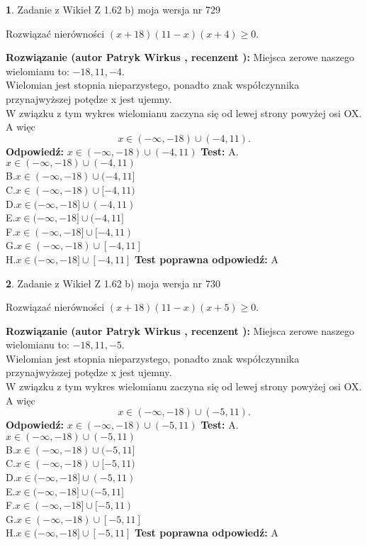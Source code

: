 \documentclass[12pt, a4paper]{article}
\theoremstyle{definition} %
\newtheorem{zad}{}
\newcommand{\zadStart}[1]{\begin{zad}#1\newline}
\newcommand{\zadStop}{\end{zad}}
\newcommand{\rozwStart}[2]{\noindent \textbf{Rozwiązanie (autor #1 , recenzent #2): }\newline}
\newcommand{\rozwStop}{\newline}
\newcommand{\odpStart}{\noindent \textbf{Odpowiedź:}\newline}
\newcommand{\odpStop}{\newline}
\newcommand{\testStart}{\noindent \textbf{Test:}\newline}
\newcommand{\testStop}{\newline}
\newcommand{\kluczStart}{\noindent \textbf{Test poprawna odpowiedź:}\newline}
\newcommand{\kluczStop}{\newline}
\begin{document}
\zadStart{Zadanie z Wikieł Z 1.62 b) moja wersja nr 729}

Rozwiązać nierówności $(x+18)(11-x)(x+4)\ge0$.
\zadStop
\rozwStart{Patryk Wirkus}{}
Miejsca zerowe naszego wielomianu to: $-18, 11, -4$.\\
Wielomian jest stopnia nieparzystego, ponadto znak współczynnika przy\linebreak najwyższej potędze x jest ujemny.\\ W związku z tym wykres wielomianu zaczyna się od lewej strony powyżej osi OX. A więc $$x \in (-\infty,-18) \cup (-4,11).$$
\rozwStop
\odpStart
$x \in (-\infty,-18) \cup (-4,11)$
\odpStop
\testStart
A.$x \in (-\infty,-18) \cup (-4,11)$\\
B.$x \in (-\infty,-18) \cup (-4,11]$\\
C.$x \in (-\infty,-18) \cup [-4,11)$\\
D.$x \in (-\infty,-18] \cup (-4,11)$\\
E.$x \in (-\infty,-18] \cup (-4,11]$\\
F.$x \in (-\infty,-18] \cup [-4,11)$\\
G.$x \in (-\infty,-18) \cup [-4,11]$\\
H.$x \in (-\infty,-18] \cup [-4,11]$
\testStop
\kluczStart
A
\kluczStop



\zadStart{Zadanie z Wikieł Z 1.62 b) moja wersja nr 730}

Rozwiązać nierówności $(x+18)(11-x)(x+5)\ge0$.
\zadStop
\rozwStart{Patryk Wirkus}{}
Miejsca zerowe naszego wielomianu to: $-18, 11, -5$.\\
Wielomian jest stopnia nieparzystego, ponadto znak współczynnika przy\linebreak najwyższej potędze x jest ujemny.\\ W związku z tym wykres wielomianu zaczyna się od lewej strony powyżej osi OX. A więc $$x \in (-\infty,-18) \cup (-5,11).$$
\rozwStop
\odpStart
$x \in (-\infty,-18) \cup (-5,11)$
\odpStop
\testStart
A.$x \in (-\infty,-18) \cup (-5,11)$\\
B.$x \in (-\infty,-18) \cup (-5,11]$\\
C.$x \in (-\infty,-18) \cup [-5,11)$\\
D.$x \in (-\infty,-18] \cup (-5,11)$\\
E.$x \in (-\infty,-18] \cup (-5,11]$\\
F.$x \in (-\infty,-18] \cup [-5,11)$\\
G.$x \in (-\infty,-18) \cup [-5,11]$\\
H.$x \in (-\infty,-18] \cup [-5,11]$
\testStop
\kluczStart
A
\kluczStop
\end{document}
